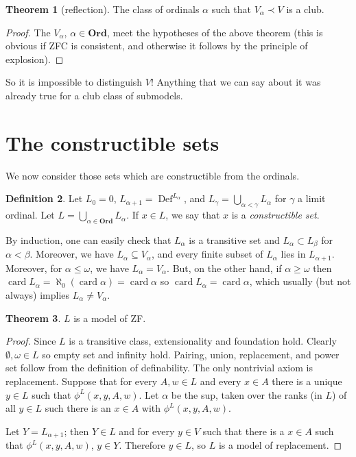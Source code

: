 \documentclass[12pt]{report}
\newcommand{\card}{\operatorname{card}}
\newcommand{\Ord}{\mathbf{Ord}}
\DeclareMathOperator{\Def}{Def}
\newcommand{\dfn}[1]{\emph{#1}\index{#1}}
\theoremstyle{definition}
\newtheorem{theorem}{Theorem}[chapter]
\newtheorem{definition}[theorem]{Definition}
\begin{document}
\begin{theorem}[reflection]
  The class of ordinals $\alpha$ such that $V_\alpha \prec V$ is a club.
\end{theorem}
\begin{proof}
The $V_\alpha$, $\alpha \in \Ord$, meet the hypotheses of the above theorem (this is obvious if ZFC is consistent, and otherwise it follows by the principle of explosion).
\end{proof}
So it is impossible to distinguish $V$! Anything that we can say about it was already true for a club class of submodels.

\section{The constructible sets}
We now consider those sets which are constructible from the ordinals.

\begin{definition}
Let $L_0 = 0$, $L_{\alpha + 1} = \Def^{L_\alpha}$, and $L_\gamma = \bigcup_{\alpha < \gamma} L_\alpha$ for $\gamma$ a limit ordinal. Let $L = \bigcup_{\alpha \in \Ord} L_\alpha$. If $x \in L$, we say that $x$ is a \dfn{constructible set}.
\end{definition}
By induction, one can easily check that $L_\alpha$ is a transitive set and $L_\alpha \subset L_\beta$ for $\alpha < \beta$. Moreover, we have $L_\alpha \subseteq V_\alpha$, and every finite subset of $L_\alpha$ lies in $L_{\alpha + 1}$. Moreover, for $\alpha \leq \omega$, we have $L_\alpha = V_\alpha$. But, on the other hand, if $\alpha \geq \omega$ then $
\card L_\alpha = \aleph_0(\card \alpha) = \card \alpha$ so $\card L_\alpha = \card \alpha$, which usually (but not always) implies $L_\alpha \neq V_\alpha$.

\begin{theorem}
$L$ is a model of ZF.
\end{theorem}
\begin{proof}
Since $L$ is a transitive class, extensionality and foundation hold. Clearly $\emptyset, \omega \in L$ so empty set and infinity hold. Pairing, union, replacement, and power set follow from the definition of definability. The only nontrivial axiom is replacement. Suppose that for every $A, w \in L$ and every $x \in A$ there is a unique $y \in L$ such that $\phi^L(x, y, A, w)$. Let $\alpha$ be the sup, taken over the ranks (in $L$) of all $y \in L$ such there is an $x \in A$ with $\phi^L(x, y, A, w)$.

Let $Y = L_{\alpha + 1}$; then $Y \in L$ and for every $y \in V$ such that there is a $x \in A$ such that $\phi^L(x, y, A, w)$, $y \in Y$. Therefore $y \in L$, so $L$ is a model of replacement.
\end{proof}
\end{document}

